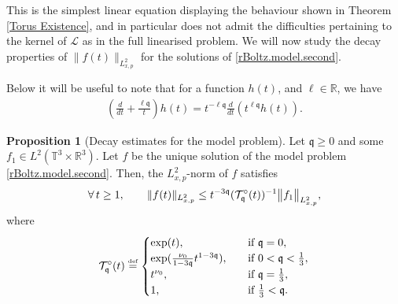 \documentclass[reqno]{amsart}
\newcommand{\eqdef }{\overset{\mbox{\tiny{def}}}{=}}
\def\norm#1{\big\Vert#1\big\Vert}
\newcommand{\qq}{\mathfrak{q}}
\newcommand{\tw}{\mathcal{T}_{\qq}}
\theoremstyle{definition}
\newtheorem{proposition}[theorem]{Proposition}
\numberwithin{equation}{section}
\numberwithin{theorem}{section}
\begin{document}
This is the simplest linear equation displaying the behaviour shown in Theorem \ref{Torus Existence}, and in particular does not admit the difficulties pertaining to the kernel of \(\mathcal{L}\) as in the full linearised problem. We will now study the decay properties of \(\|f(t)\|_{L^2_{x,p}}\) for the solutions of \eqref{rBoltz.model.second}. 


Below it will be useful to note that for a function $h(t)$, and $\ell\in \mathbb{R}$, we have 
\begin{align}\label{timeDeriv.pq}
   \left( \frac{d}{d t}+ \frac{\ell\qq }{t}  \right)h(t)=t^{-\ell\qq} \frac{d}{d t}\left( t^{\ell\qq} h(t) \right).
\end{align}

\begin{proposition}[Decay estimates for the model problem]\label{proplinearmodel}
    Let \(\qq\geq 0\) and some \(f_1\in L^2(\mathbb{T}^3\times \mathbb{R}^3)\). Let \(f\) be the unique solution of the model problem \eqref{rBoltz.model.second}. Then, the \(L_{x,p}^2\)-norm of \(f\) satisfies
    \begin{align}\notag
\forall \,t\geq 1,\qquad    {\Vert{ f(t)}\Vert_{L^2_{x,p}}}
\leq t^{-3\qq}
(\tw^{\circ}(t))^{-1}\norm{ {f}_1}_{ L^2_{x,p}},
\end{align}
where 
\begin{equation}\notag
    \tw^{\circ}(t)\eqdef
    \begin{cases}
    \exp( t),\quad &\text{if} \,\,\qq=0,\\
        \exp (\frac{\nu_0}{1-3\qq}t^{1-3\qq}),\quad &\text{if} \,\,0<\qq<\frac{1}{3},\\
        t^{\nu_0},\qquad &\text{if} \,\,\qq=\frac{1}{3},\\
        1,\qquad &\text{if} \,\,\frac{1}{3}<\qq .
    \end{cases}
\end{equation}
\end{proposition}
\end{document}
